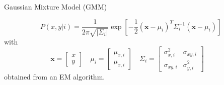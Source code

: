 

\begin{frame}{Gaussian Mixture Model (GMM)}

\begin{equation}
P(x,y|i) = \frac{1}{2\pi\sqrt{|\Sigma_i|}} \exp
\left[ -\frac{1}{2}(\mathbf{x}-\mu_i)^T\Sigma_i^{-1}(\mathbf{x}-\mu_i) \right]
\end{equation}
with
\[
\mathbf{x} = \left[ \begin{array}{c} x \\ y \end{array} \right] \quad
\mu_i = \left[ \begin{array}{c} \mu_{x,i} \\ \mu_{x,i} \end{array} \right] \quad
\Sigma_i = \left[ \begin{array}{cc} \sigma^2_{x,i} & \sigma_{xy,i} \\
    \sigma_{xy,i} & \sigma^2_{y,i} \end{array} \right] \quad
\]
obtained from an EM algorithm.
\end{frame}

